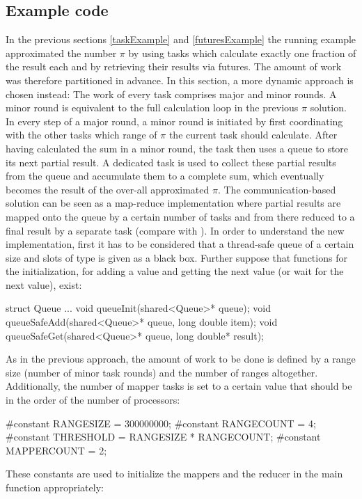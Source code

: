\subsection{Example code}
\label{sharedMemoryExample}
In the previous sections \ref{taskExample} and \ref{futuresExample} the running example approximated the number $\pi$ by using tasks which calculate exactly one fraction of the result each and by retrieving their results via futures. The amount of work was therefore partitioned in advance. In this section, a more dynamic approach is chosen instead: The work of every task comprises major and minor rounds. A minor round is equivalent to the full calculation loop in the previous $\pi$ solution. In every step of a major round, a minor round is initiated by first coordinating with the other tasks which range of $\pi$ the current task should calculate. After having calculated the sum in a minor round, the task then uses a queue to store its next partial result. A dedicated task is used to collect these partial results from the queue and accumulate them to a complete sum, which eventually becomes the result of the over-all approximated $\pi$. The communication-based solution can be seen as a map-reduce implementation where partial results are mapped onto the queue by a certain number of tasks and from there reduced to a final result by a separate task (compare with \cite{MapReduce}).
In order to understand the new implementation, first it has to be considered that a thread-safe queue of a certain size and slots of type  is given as a black box. Further suppose that functions for the initialization, for adding a value and getting the next value (or wait for the next value), exist:
\begin{ccode}
struct Queue {...}
void queueInit(shared<Queue>* queue);
void queueSafeAdd(shared<Queue>* queue, long double item);
void queueSafeGet(shared<Queue>* queue, long double* result);
\end{ccode}
As in the previous approach, the amount of work to be done is defined by a range size (number of minor task rounds) and the number of ranges altogether. Additionally, the number of mapper tasks is set to a certain value that should be in the order of the number of processors:
\begin{ccode}
#constant RANGESIZE = 300000000; 
#constant RANGECOUNT = 4; 
#constant THRESHOLD = RANGESIZE * RANGECOUNT; 
#constant MAPPERCOUNT = 2;
\end{ccode}
These constants are used to initialize the mappers and the reducer in the main function appropriately:
